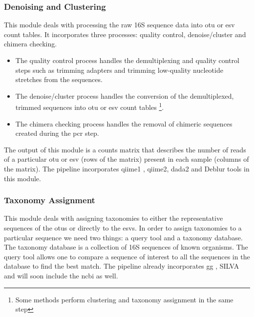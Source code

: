   \subsubsection*{Denoising and Clustering}
    \vspace{-5mm}
    This module deals with processing the raw 16S sequence data into \ac{otu} or \ac{esv} count tables.
    It incorporates three processes: quality control, denoise/cluster and chimera checking.
    \begin{itemize}
      \item The quality control process handles the demultiplexing and quality control steps such as trimming adapters and trimming low-quality nucleotide stretches from the sequences.
      \item The denoise/cluster process handles the conversion of the demultiplexed, trimmed sequences into \ac{otu} or \ac{esv} count tables \footnote{Some methods perform clustering and taxonomy assignment in the same step}.
      \item The chimera checking process handles the removal of chimeric sequences created during the \ac{pcr} step.
    \end{itemize}
    The output of this module is a counts matrix that describes the number of reads of a particular \ac{otu} or \ac{esv} (rows of the matrix) present in each sample (columns of the matrix). The pipeline incorporates \ac{qiime1} \cite{Caporaso2010}, \ac{qiime2}, \ac{dada2} \cite{Callahan2016} and Deblur \cite{Amir2017} tools in this module.

  \subsubsection*{Taxonomy Assignment}
    \vspace{-5mm}
    This module deals with assigning taxonomies to either the representative sequences of the \ac{otu}s or directly to the \ac{esv}s.
    In order to assign taxonomies to a particular sequence we need two things: a query tool and a taxonomy database.
    The taxonomy database is a collection of 16S sequences of known organisms.
    The query tool allows one to compare a sequence of interest to all the sequences in the database to find the best match.
    The pipeline already incorporates \ac{gg} \cite{DeSantis2006}, SILVA \cite{Quast2012} and will soon include the \ac{ncbi} \cite{Sayers2009} as well.

